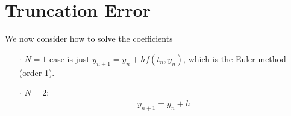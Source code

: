\documentclass[a4paper, 11pt]{article}
\begin{document}
\section{Truncation Error}
We now consider how to solve the coefficients 
\begin{itemize}
	\item[$\cdot$] $N=1$ case is just $y_{n+1} = y_n +hf(t_n, y_n)$, which is the Euler method (order 1).

	\item[$\cdot$] $N=2$:
	\begin{equation}
		\begin{split}
			y_{n+1} = y_n +h
		\end{split}
	\end{equation}
\end{itemize}
\end{document}
